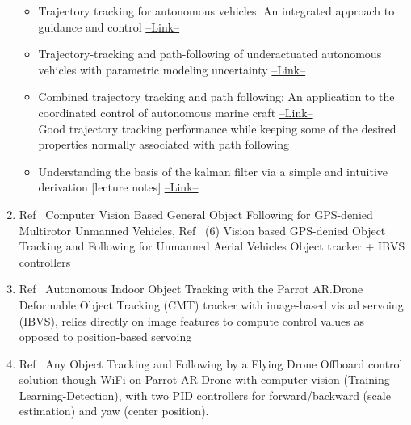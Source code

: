 \begin{enumerate}
\begin{itemize}
\item Trajectory tracking for autonomous vehicles: An integrated approach to guidance and control \href{https://www.scopus.com/record/display.uri?eid=2-s2.0-0031673631&origin=reflist}{--Link--} \\

\item Trajectory-tracking and path-following of underactuated autonomous vehicles with parametric modeling uncertainty \href{https://www.scopus.com/record/display.uri?eid=2-s2.0-34548237452&origin=reflist}{--Link--} \\

\item Combined trajectory tracking and path following: An application to the coordinated control of autonomous marine craft \href{https://www.scopus.com/record/display.uri?eid=2-s2.0-0035713115&origin=reflist}{--Link--} \\ 
Good trajectory tracking performance while keeping some of the desired properties normally associated with path following

\item Understanding the basis of the kalman filter via a simple and intuitive derivation [lecture notes] \href{https://www.scopus.com/record/display.uri?eid=2-s2.0-85032780920&origin=reflist}{--Link--} \\
\end{itemize}

\item Ref~\cite{Pestana20141886} Computer Vision Based General Object Following for GPS-denied Multirotor Unmanned Vehicles, Ref~\cite{Pestana2013} (6) Vision based GPS-denied Object Tracking and Following for Unmanned Aerial Vehicles
Object tracker + IBVS controllers

\item Ref~\cite{Chakrabarty201625} Autonomous Indoor Object Tracking with the Parrot AR.Drone
Deformable Object
Tracking (CMT) tracker with image-based visual servoing (IBVS), relies directly on image features to compute control values as opposed to position-based servoing

\item Ref~\cite{Bartak201635} Any Object Tracking and Following by a Flying Drone
 Offboard control solution though WiFi on Parrot AR Drone with computer vision (Training-Learning-Detection), with two PID controllers for forward/backward (scale estimation) and yaw (center position).

\end{enumerate}